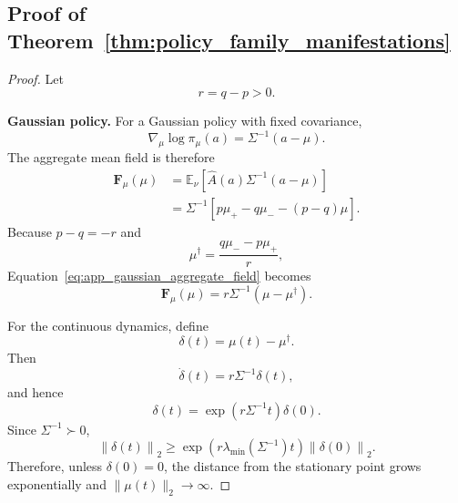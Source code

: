 \subsection{Proof of
Theorem~\ref{thm:policy_family_manifestations}}
\label{app:policy_family_manifestations}

\begin{proof}
Let
\begin{equation}
    r
    =
    q-p
    >
    0.
\end{equation}

\medskip
\noindent\textbf{Gaussian policy.}
For a Gaussian policy with fixed covariance,
\begin{equation}
    \nabla_{\mu}
    \log\pi_{\mu}(a)
    =
    \Sigma^{-1}(a-\mu).
    \label{eq:app_gaussian_mean_score}
\end{equation}
The aggregate mean field is therefore
\begin{equation}
\begin{aligned}
    \mathbf{F}_{\mu}(\mu)
    &=
    \mathbb{E}_{\nu}
    \left[
        \widehat{A}(a)
        \Sigma^{-1}(a-\mu)
    \right] \\
    &=
    \Sigma^{-1}
    \left[
        p\mu_{+}
        -
        q\mu_{-}
        -
        (p-q)\mu
    \right].
\end{aligned}
\label{eq:app_gaussian_aggregate_field}
\end{equation}
Because $p-q=-r$ and
\begin{equation}
    \mu^{\dagger}
    =
    \frac{
        q\mu_{-}
        -
        p\mu_{+}
    }{
        r
    },
\end{equation}
Equation~\eqref{eq:app_gaussian_aggregate_field} becomes
\begin{equation}
    \mathbf{F}_{\mu}(\mu)
    =
    r\Sigma^{-1}
    \left(
        \mu-\mu^{\dagger}
    \right).
\end{equation}

For the continuous dynamics, define
\begin{equation}
    \delta(t)
    =
    \mu(t)-\mu^{\dagger}.
\end{equation}
Then
\begin{equation}
    \dot{\delta}(t)
    =
    r\Sigma^{-1}\delta(t),
\end{equation}
and hence
\begin{equation}
    \delta(t)
    =
    \exp
    \left(
        r\Sigma^{-1}t
    \right)
    \delta(0).
    \label{eq:app_gaussian_continuous_solution}
\end{equation}
Since $\Sigma^{-1}\succ0$,
\begin{equation}
    \left\|
        \delta(t)
    \right\|_2
    \geq
    \exp
    \left(
        r\lambda_{\min}
        \left(
            \Sigma^{-1}
        \right)t
    \right)
    \left\|
        \delta(0)
    \right\|_2.
    \label{eq:app_gaussian_continuous_growth}
\end{equation}
Therefore, unless
$\delta(0)=0$, the distance from the stationary point grows
exponentially and
$\|\mu(t)\|_2\rightarrow\infty$.


\end{proof}
